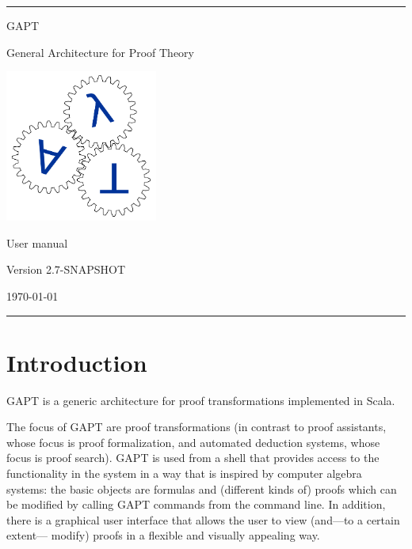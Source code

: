 \documentclass[a4paper,11pt]{article}
\begin{document}
\begin{titlepage}
\begin{center}

\hrule

\vspace*{20mm}

{\Huge GAPT}

\vspace*{5mm}

{\huge General Architecture for Proof Theory}

\vspace*{20mm}

\includegraphics[keepaspectratio,width=5cm]{logo}

\vspace*{20mm}

{\Huge User manual}

\vspace*{10mm}
{\Large Version 2.7-SNAPSHOT}
\vspace*{10mm}

{\Large \today}

\vspace*{20mm}

\hrule
\end{center}

\end{titlepage}

\listoffixmes

\tableofcontents
\vfill
\pagebreak

\section{Introduction}

GAPT is a generic architecture for proof transformations implemented in Scala.

The focus of GAPT are proof transformations (in contrast to proof assistants,
whose focus is proof formalization, and automated deduction systems, whose focus
is proof search). GAPT is used from a shell that provides access to the functionality
in the system in a way that is inspired by computer algebra systems: the basic
objects are formulas and (different kinds of) proofs which can be modified
by calling GAPT commands from the command line. In addition, there
is a graphical user interface that allows the user to view (and—to a certain extent—
modify) proofs in a flexible and visually appealing way.
\end{document}
